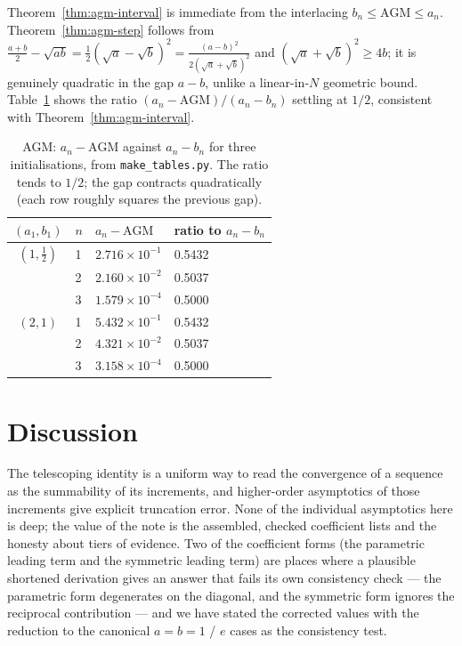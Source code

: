 \documentclass[11pt]{article}
\theoremstyle{plain}
\theoremstyle{remark}
\begin{document}
\noindent Theorem~\ref{thm:agm-interval} is immediate from the interlacing
$b_n \le \mathrm{AGM} \le a_n$. Theorem~\ref{thm:agm-step} follows from
$\tfrac{a+b}{2}-\sqrt{ab} = \tfrac12(\sqrt a - \sqrt b)^2
= \tfrac{(a-b)^2}{2(\sqrt a+\sqrt b)^2}$ and $(\sqrt a+\sqrt b)^2 \ge 4b$; it is
genuinely quadratic in the gap $a-b$, unlike a linear-in-$N$ geometric bound.
Table~\ref{tab:agm} shows the ratio $(a_n-\mathrm{AGM})/(a_n-b_n)$ settling at
$1/2$, consistent with Theorem~\ref{thm:agm-interval}.

\begin{table}[ht]
\centering
\caption{AGM: $a_n - \mathrm{AGM}$ against $a_n - b_n$ for three
initialisations, from \texttt{make\_tables.py}. The ratio tends to $1/2$; the
gap contracts quadratically (each row roughly squares the previous gap).}
\label{tab:agm}
\begin{tabular}{clll}
\toprule
$(a_1,b_1)$ & $n$ & $a_n - \mathrm{AGM}$ & ratio to $a_n-b_n$ \\
\midrule
$(1,\tfrac12)$ & 1 & $2.716\times10^{-1}$ & 0.5432 \\
               & 2 & $2.160\times10^{-2}$ & 0.5037 \\
               & 3 & $1.579\times10^{-4}$ & 0.5000 \\
$(2,1)$        & 1 & $5.432\times10^{-1}$ & 0.5432 \\
               & 2 & $4.321\times10^{-2}$ & 0.5037 \\
               & 3 & $3.158\times10^{-4}$ & 0.5000 \\
\bottomrule
\end{tabular}
\end{table}

\section{Discussion}
\label{sec:disc}

The telescoping identity is a uniform way to read the convergence of a
sequence as the summability of its increments, and higher-order asymptotics of
those increments give explicit truncation error. None of the individual
asymptotics here is deep; the value of the note is the assembled, checked
coefficient lists and the honesty about tiers of evidence. Two of the
coefficient forms (the parametric leading term and the symmetric leading term)
are places where a plausible shortened derivation gives an answer that fails its
own consistency check --- the parametric form degenerates on the diagonal, and
the symmetric form ignores the reciprocal contribution --- and we have stated
the corrected values with the reduction to the canonical $a=b=1$ /
$e$ cases as the consistency test.
\end{document}
